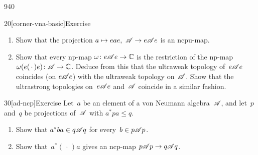 \begin{parsec}{940}
\begin{point}{20}[corner-vna-basic]{Exercise}
\begin{enumerate}
Conclude that~$e\scrA e$ is a von Neumann algebra.
\item
Show that the projection $a\mapsto eae,\ \mathscr{A}\to e\mathscr{A} e$
is an ncpu-map.
\item
Show that every np-map $\omega\colon e\mathscr{A} e\to\mathbb{C}$
is the restriction
of the np-map $\omega(e(\,\cdot\,)e)\colon \mathscr{A}\to\mathbb{C}$.
Deduce from this that the ultraweak topology of~$e\scrA e$
coincides (on $e\scrA e$) with the ultraweak topology on~$\mathscr{A}$.
Show that the ultrastrong topologies on~$e\scrA e$ and~$\mathscr{A}$
coincide in a similar fashion.
\end{enumerate}
\spacingfix
\end{point}%
\begin{point}{30}[ad-ncp]{Exercise}%
Let~$a$ be an element of a von Neumann algebra~$\mathscr{A}$,
and let~$p$ and~$q$ be projections
of~$\mathscr{A}$ with $a^*pa\leq q$.
\begin{enumerate}
\item
Show that $a^*ba\in q\mathscr{A} q$
for every~$b\in p\mathscr{A} p$.
\item
Show that~$a^*(\,\cdot\,)a$
gives an ncp-map $p\mathscr{A} p\to q\mathscr{A} q$.
\end{enumerate}
\spacingfix%
\end{point}%
\end{parsec}%
